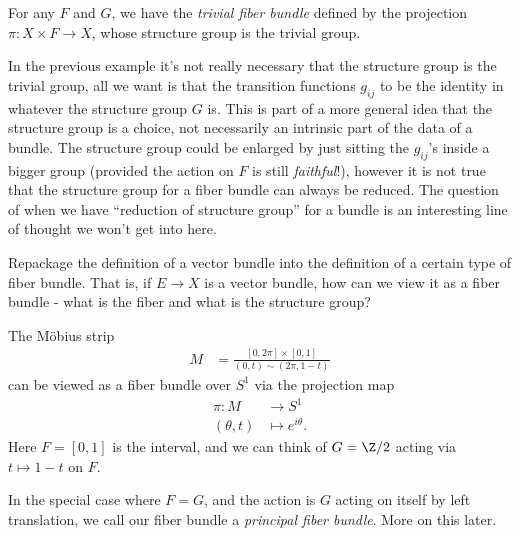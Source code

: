 \documentclass[11pt]{amsart}
\begin{document}
\begin{example} For any $F$ and $G$, we have the \emph{trivial fiber bundle} defined by the projection $\pi \colon X \times F \to X$, whose structure group is the trivial group.
\end{example}

\begin{remark} In the previous example it's not really necessary that the structure group is the trivial group, all we want is that the transition functions $g_{ij}$ to be the identity in whatever the structure group $G$ is. This is part of a more general idea that the structure group is a choice, not necessarily an intrinsic part of the data of a bundle. The structure group could be enlarged by just sitting the $g_{ij}$'s inside a bigger group (provided the action on $F$ is still \emph{faithful}!), however it is not true that the structure group for a fiber bundle can always be reduced. The question of when we have ``reduction of structure group'' for a bundle is an interesting line of thought we won't get into here.
\end{remark}

\begin{exercise} Repackage the definition of a vector bundle into the definition of a certain type of fiber bundle. That is, if $E \to X$ is a vector bundle, how can we view it as a fiber bundle - what is the fiber and what is the structure group?
\end{exercise}




\begin{example} The M\"{o}bius strip
\begin{align*}
    M &= \frac{[0,2\pi] \times [0,1]}{(0,t)\sim (2\pi,1-t)}
\end{align*}
can be viewed as a fiber bundle over $S^1$ via the projection map
\begin{align*}
    \pi \colon M &\to S^1 \\
    (\theta,t) &\mapsto e^{i \theta}.
\end{align*}
Here $F = [0,1]$ is the interval, and we can think of $G = \Z/2$ acting via $t \mapsto 1-t$ on $F$.
\end{example}

\begin{example} In the special case where $F = G$, and the action is $G$ acting on itself by left translation, we call our fiber bundle a \emph{principal fiber bundle}. More on this later.
\end{example}
\end{document}
